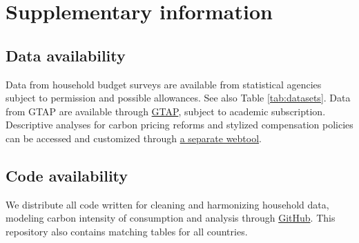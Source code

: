 \documentclass[12pt, a4paper]{article}
\begin{document}
\begin{refsection}

\clearpage


\clearpage


\clearpage


\clearpage


\clearpage


\clearpage


\clearpage

\begin{refcontext}[sorting=nyt]
\printbibliography[heading=subbibliography, title ={References (Appendix)}]
\end{refcontext}
\end{refsection}

\clearpage

\section{Supplementary information}

\subsection{Data availability} \label{data_availability} Data from household budget surveys are available from statistical agencies subject to permission and possible allowances. See also Table \ref{tab:datasets}. Data from GTAP are available through \href{https://www.gtap.agecon.purdue.edu/}{GTAP}, subject to academic subscription.
Descriptive analyses for carbon pricing reforms and stylized compensation policies can be accessed and customized through \href{https://www.cpic-global.net/}{a separate webtool}.

\subsection{Code availability} \label{code}
We distribute all code written for cleaning and harmonizing household data, modeling carbon intensity of consumption and analysis through \href{https://github.com/lmissbach/Carbon-Intensity-2023}{GitHub}. This repository also contains matching tables for all countries.
\end{document}
